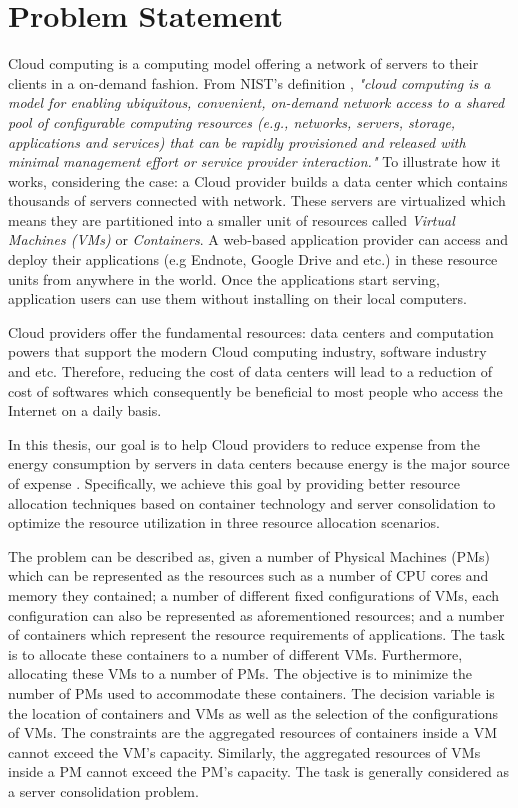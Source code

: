 

\section{Problem Statement}

Cloud computing is a computing model offering a network of servers to their clients in a on-demand fashion. From NIST's definition \cite{Mell:2011jj}, \textit{"cloud computing is a model for enabling ubiquitous, convenient, on-demand network access to a shared pool of configurable computing resources (e.g., networks, servers, storage, applications and services) that can be rapidly provisioned and released with minimal management effort or service provider interaction."} 
To illustrate how it works, considering the case: a Cloud provider builds a data center which contains thousands of servers connected with network. These servers are virtualized which means they are partitioned into a smaller unit of resources called \emph{Virtual Machines (VMs)} or \emph{Containers}. A web-based application provider can access and deploy their applications (e.g Endnote, Google Drive and etc.) in these resource units from anywhere in the world. Once the applications start serving, application users can use them without installing on their local computers.

Cloud providers offer the fundamental resources: data centers and computation powers that support the modern Cloud computing industry, software industry and etc. Therefore, reducing the cost of data centers will lead to a reduction of cost of softwares which consequently be beneficial to most people who access the Internet on a daily basis.

In this thesis, our goal is to help Cloud providers to reduce expense from the energy consumption by servers in data centers because energy is the major source of expense \cite{Kaplan:up01fR-k}. Specifically, we achieve this goal by providing better resource allocation techniques based on container technology and server consolidation to optimize the resource utilization in three resource allocation scenarios.

The problem can be described as, given a number of Physical Machines (PMs) which can be represented as the resources such as a number of CPU cores and memory they contained; a number of different fixed configurations of VMs, each configuration can also be represented as aforementioned resources; and a number of containers which represent the resource requirements of applications. The task is to allocate these containers to a number of different VMs. Furthermore, allocating these VMs to a number of PMs. The objective is to minimize the number of PMs used to accommodate these containers. The decision variable is the location of containers and VMs as well as the selection of the configurations of VMs. The constraints are the aggregated resources of containers inside a VM cannot exceed the VM's capacity. Similarly, the aggregated resources of VMs inside a PM cannot exceed the PM's capacity. The task is generally considered as a server consolidation problem.

